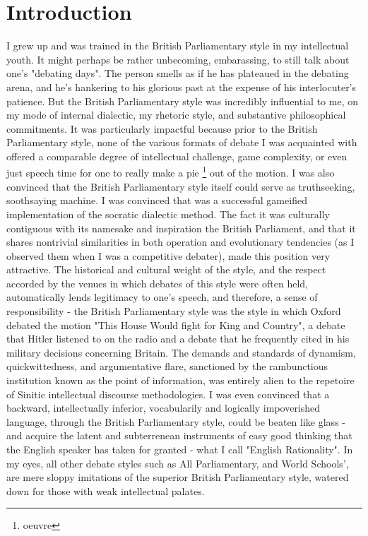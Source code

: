\section{Introduction}

I grew up and was trained in the British Parliamentary style in my intellectual youth. It might perhaps be rather unbecoming, embarassing, to still talk about one's "debating days". The person smells as if he has plateaued in the debating arena, and he's hankering to his glorious past at the expense of his interlocuter's patience. But the British Parliamentary style was incredibly influential to me, on my mode of internal dialectic, my rhetoric style, and substantive philosophical commitments. It was particularly impactful because prior to the British Parliamentary style, none of the various formats of debate I was acquainted with offered a comparable degree of intellectual challenge, game complexity, or even just speech time for one to really make a pie \footnote{oeuvre} out of the motion. I was also convinced that the British Parliamentary style itself could serve as truthseeking, soothsaying machine. I was convinced that was a successful gameified implementation of the socratic dialectic method. The fact it was culturally contiguous with its namesake and inspiration the British Parliament, and that it shares nontrivial similarities in both operation and evolutionary tendencies (as I observed them when I was a competitive debater), made this position very attractive. The historical and cultural weight of the style, and the respect accorded by the venues in which debates of this style were often held, automatically lends legitimacy to one's speech, and therefore, a sense of responsibility - the British Parliamentary style was the style in which Oxford debated the motion "This House Would fight for King and Country", a debate that Hitler listened to on the radio and a debate that he frequently cited in his military decisions concerning Britain. The demands and standards of dynamism, quickwittedness, and argumentative flare, sanctioned by the rambunctious institution known as the point of information, was entirely alien to the repetoire of Sinitic intellectual discourse methodologies. I was even convinced that a backward, intellectually inferior, vocabularily and logically impoverished language, through the British Parliamentary style, could be beaten like glass - and acquire the latent and subterrenean instruments of easy good thinking that the English speaker has taken for granted - what I call "English Rationality". In my eyes, all other debate styles such as All Parliamentary, and World Schools', are mere sloppy imitations of the superior British Parliamentary style, watered down for those with weak intellectual palates.

